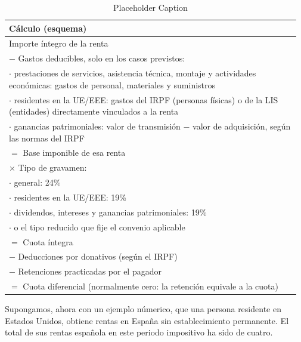 \documentclass[10pt,a4paper]{article}
\begin{document}
  \begin{table}[h]
    \caption{Placeholder Caption}
    \label{tab:placeholder_label}
    \centering
    \begin{tabular}{p{0.97\linewidth}}
        \hline
        \textbf{Cálculo (esquema)} \\
        \hline
        Importe íntegro de la renta \\
        $-$ Gastos deducibles, solo en los casos previstos: \\
        \hspace{1.5em}$\cdot$ prestaciones de servicios, asistencia técnica, montaje y actividades económicas: gastos de personal, materiales y suministros \\
        \hspace{1.5em}$\cdot$ residentes en la UE/EEE: gastos del IRPF (personas físicas) o de la LIS (entidades) directamente vinculados a la renta \\
        \hspace{1.5em}$\cdot$ ganancias patrimoniales: valor de transmisión $-$ valor de adquisición, según las normas del IRPF \\
        \hline
        $=$ Base imponible de esa renta \\
        $\times$ Tipo de gravamen: \\
        \hspace{1.5em}$\cdot$ general: 24\% \\
        \hspace{1.5em}$\cdot$ residentes en la UE/EEE: 19\% \\
        \hspace{1.5em}$\cdot$ dividendos, intereses y ganancias patrimoniales: 19\% \\
        \hspace{1.5em}$\cdot$ o el tipo reducido que fije el convenio aplicable \\
        \hline
        $=$ Cuota íntegra \\
        $-$ Deducciones por donativos (según el IRPF) \\
        $-$ Retenciones practicadas por el pagador \\
        \hline
        $=$ Cuota diferencial (normalmente cero: la retención equivale a la cuota) \\
        \hline
    \end{tabular}
\end{table}

Supongamos, ahora con un ejemplo númerico, que una persona residente en Estados Unidos, obtiene rentas en España sin establecimiento permanente. El total de sus rentas española en este periodo impositivo ha sido de cuatro.
\end{document}
